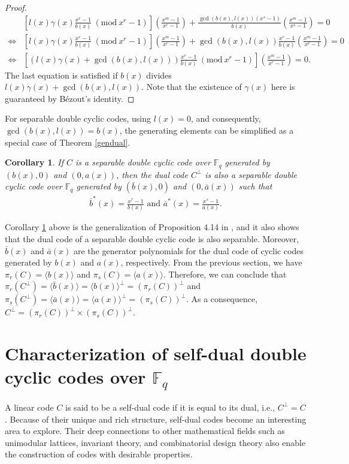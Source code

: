 \documentclass[12pt]{article}
\newtheorem{corollary}[theorem]{Corollary}
\newcommand{\Mod}[1]{\ (\mathrm{mod}\ #1)}
\begin{document}
\begin{proof}
		\begin{align*}
			&\left[l(x) \gamma(x)\frac{x^r-1}{b(x)} \Mod{x^r-1}\right]\left(\frac{x^m-1}{x^r-1}\right)+ \frac{\gcd(b(x),l(x))(x^s-1)}{b(x)}\left(\frac{x^m-1}{x^s-1}\right)=0\\
			\Leftrightarrow &\left[l(x) \gamma(x)\frac{x^r-1}{b(x)} \Mod{x^r-1}\right]\left(\frac{x^m-1}{x^r-1}\right)+ \gcd(b(x),l(x))\frac{x^r-1}{b(x)}\left(\frac{x^m-1}{x^r-1}\right)=0\\
			\Leftrightarrow &\left[(l(x) \gamma(x)+\gcd(b(x),l(x)))\frac{x^r-1}{b(x)} \Mod{x^r-1}\right]\left(\frac{x^m-1}{x^r-1}\right)=0.
		\end{align*}
		The last equation is satisfied if $b(x)$ divides $l(x) \gamma(x)+\gcd(b(x),l(x))$. Note that the existence of $\gamma(x)$ here is guaranteed by B\'ezout's identity.
	\end{proof}
	For separable double cyclic codes, using $l(x)=0$, and consequently, $\gcd(b(x),l(x))=b(x)$, the generating elements can be simplified as a special case of Theorem \ref{gendual}.
	\begin{corollary}\label{gendualsep}
		If $C$ is a separable double cyclic code over $\mathbb{F}_q$ generated by $(b(x),0)$ and $(0,a(x))$, then the dual code $C^{\perp}$ is also a separable double cyclic code over $\mathbb{F}_q$ generated by $(\bar{b}(x),0)$ and $(0,\bar{a}(x))$ such that
		\begin{align*}
			\bar{b}^{*}(x)=\frac{x^r-1}{b(x)} \text{ and } \bar{a}^{*}(x)=\frac{x^s-1}{a(x)}.
		\end{align*}
	\end{corollary}
	
	Corollary \ref{gendualsep} above is the generalization of Proposition 4.14 in \cite{Borges2018}, and it also shows that the dual code of a separable double cyclic code is also separable. Moreover, $\bar{b}(x)$ and $\bar{a}(x)$ are the generator polynomials for the dual code of cyclic codes generated by $b(x)$ and $a(x)$, respectively. From the previous section, we have $\pi_r(C)=\langle b(x)\rangle$ and $\pi_s(C)=\langle a(x)\rangle$.  Therefore, we can conclude that $\pi_r(C^{\perp})=\langle\bar{b}(x)\rangle=\langle b(x)\rangle^{\perp}=(\pi_r(C))^{\perp}$ and $\pi_s(C^{\perp})=\langle\bar{a}(x)\rangle=\langle a(x)\rangle^{\perp}=(\pi_s(C))^{\perp}$. As a consequence, $C^{\perp}=(\pi_r(C))^{\perp}\times (\pi_s(C))^{\perp}$.
	
	\section{Characterization of self-dual double cyclic codes over $\mathbb{F}_q$}
	A linear code $C$ is said to be a self-dual code if it is equal to its dual, i.e., $C^{\perp}=C$. Because of their unique and rich structure, self-dual codes become an interesting area to explore. Their deep connections to other mathematical fields such as unimodular lattices, invariant theory, and combinatorial design theory also enable the construction of codes with desirable properties.
	
\end{document}
